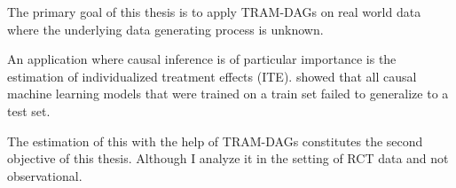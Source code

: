 The primary goal of this thesis is to apply TRAM-DAGs on real world data where the underlying data generating process is unknown. 



An application where causal inference is of particular importance is the estimation of individualized treatment effects (ITE). \citet{chen2025} showed that all causal machine learning models that were trained on a train set failed to generalize to a test set. 

The estimation of this with the help of TRAM-DAGs constitutes the second objective of this thesis. Although I analyze it in the setting of RCT data and not observational.


